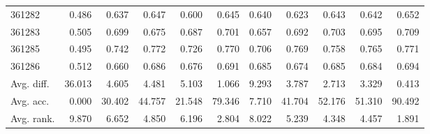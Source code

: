 \begin{tabular}{lrrrrrrrrrr}
361282 & 0.486 & 0.637 & 0.647 & 0.600 & 0.645 & 0.640 & 0.623 & 0.643 & 0.642 & 0.652 \\
361283 & 0.505 & 0.699 & 0.675 & 0.687 & 0.701 & 0.657 & 0.692 & 0.703 & 0.695 & 0.709 \\
361285 & 0.495 & 0.742 & 0.772 & 0.726 & 0.770 & 0.706 & 0.769 & 0.758 & 0.765 & 0.771 \\
361286 & 0.512 & 0.660 & 0.686 & 0.676 & 0.691 & 0.685 & 0.674 & 0.685 & 0.684 & 0.694 \\
Avg. diff. & 36.013 & 4.605 & 4.481 & 5.103 & 1.066 & 9.293 & 3.787 & 2.713 & 3.329 & 0.413 \\
Avg. acc. & 0.000 & 30.402 & 44.757 & 21.548 & 79.346 & 7.710 & 41.704 & 52.176 & 51.310 & 90.492 \\
Avg. rank. & 9.870 & 6.652 & 4.850 & 6.196 & 2.804 & 8.022 & 5.239 & 4.348 & 4.457 & 1.891 \\
\bottomrule
\end{tabular}
